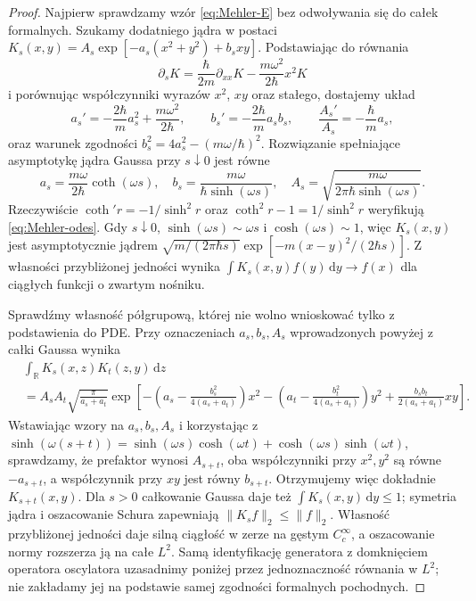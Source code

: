 \documentclass[11pt,a4paper,oneside]{report}
\numberwithin{equation}{chapter}
\theoremstyle{plain}
\theoremstyle{definition}
\theoremstyle{remark}
\newcommand{\R}{\mathbb{R}}
\newcommand{\dd}{\mathrm{d}}
\begin{document}
\begin{proof}
Najpierw sprawdzamy wzór \eqref{eq:Mehler-E}
bez odwoływania się do całek formalnych.
Szukamy dodatniego jądra w postaci
$K_s(x,y)=A_s\exp[-a_s(x^2+y^2)+b_sxy]$.
Podstawiając do równania
\[
 \partial_sK=\frac{\hbar}{2m}\partial_{xx}K
    -\frac{m\omega^2}{2\hbar}x^2K
\]
i porównując współczynniki wyrazów $x^2$, $xy$
oraz stałego, dostajemy układ
\[
 a_s'= -\frac{2\hbar}{m}a_s^2+
       \frac{m\omega^2}{2\hbar},\qquad
 b_s'=-\frac{2\hbar}{m}a_sb_s,\qquad
 \frac{A_s'}{A_s}=-\frac{\hbar}{m}a_s,
\tag{16.11}\label{eq:Mehler-odes}
\]
oraz warunek zgodności
$b_s^2=4a_s^2-(m\omega/\hbar)^2$.
Rozwiązanie spełniające asymptotykę jądra Gaussa
przy $s\downarrow0$ jest równe
\[
 a_s=\frac{m\omega}{2\hbar}\coth(\omega s),\quad
 b_s=\frac{m\omega}{\hbar\sinh(\omega s)},\quad
 A_s=\sqrt{\frac{m\omega}{2\pi\hbar\sinh(\omega s)}}.
\]
Rzeczywiście $\coth' r=-1/\sinh^2r$ oraz
$\coth^2r-1=1/\sinh^2r$ weryfikują
\eqref{eq:Mehler-odes}. Gdy $s\downarrow0$,
$\sinh(\omega s)\sim\omega s$ i
$\cosh(\omega s)\sim1$, więc $K_s(x,y)$ jest
asymptotycznie jądrem
$\sqrt{m/(2\pi\hbar s)}
\exp[-m(x-y)^2/(2\hbar s)]$.
Z własności przybliżonej jedności wynika
$\int K_s(x,y)f(y)\,\dd y\to f(x)$
dla ciągłych funkcji o zwartym nośniku.

Sprawdźmy własność półgrupową, której nie wolno
wnioskować tylko z podstawienia do PDE. Przy oznaczeniach
$a_s,b_s,A_s$ wprowadzonych powyżej z całki Gaussa wynika
\[
\begin{split}
&\int_{\R}K_s(x,z)K_t(z,y)\,\dd z\\
&=A_sA_t\sqrt{\frac{\pi}{a_s+a_t}}
\exp\!\left[-\left(a_s-\frac{b_s^2}{4(a_s+a_t)}\right)x^2
-\left(a_t-\frac{b_t^2}{4(a_s+a_t)}\right)y^2
+\frac{b_sb_t}{2(a_s+a_t)}xy\right].
\end{split}
\]
Wstawiając wzory na $a_s,b_s,A_s$ i korzystając z
$\sinh(\omega(s+t))=\sinh(\omega s)\cosh(\omega t)
+\cosh(\omega s)\sinh(\omega t)$, sprawdzamy, że
prefaktor wynosi $A_{s+t}$, oba współczynniki przy
$x^2,y^2$ są równe $-a_{s+t}$, a współczynnik przy
$xy$ jest równy $b_{s+t}$. Otrzymujemy więc dokładnie
$K_{s+t}(x,y)$.
Dla $s>0$ całkowanie Gaussa daje też
$\int K_s(x,y)\,\dd y\le1$; symetria jądra i
oszacowanie Schura zapewniają
$\|K_sf\|_2\le\|f\|_2$.
Własność przybliżonej jedności daje silną ciągłość
w zerze na gęstym $C_c^\infty$, a oszacowanie normy
rozszerza ją na całe $L^2$. Samą identyfikację
generatora z domknięciem operatora oscylatora
uzasadnimy poniżej przez jednoznaczność równania
w $L^2$; nie zakładamy jej na podstawie samej
zgodności formalnych pochodnych.


\end{proof}
\end{document}
